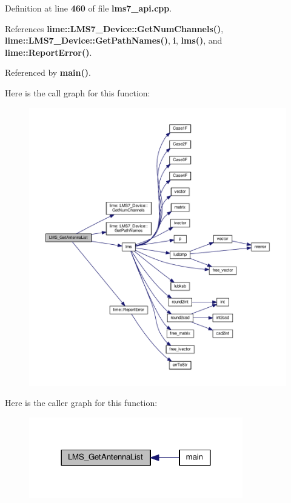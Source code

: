 Definition at line {\bf 460} of file {\bf lms7\+\_\+api.\+cpp}.



References {\bf lime\+::\+L\+M\+S7\+\_\+\+Device\+::\+Get\+Num\+Channels()}, {\bf lime\+::\+L\+M\+S7\+\_\+\+Device\+::\+Get\+Path\+Names()}, {\bf i}, {\bf lms()}, and {\bf lime\+::\+Report\+Error()}.



Referenced by {\bf main()}.



Here is the call graph for this function\+:
\nopagebreak
\begin{figure}[H]
\begin{center}
\leavevmode
\includegraphics[width=350pt]{df/de1/lms7__api_8cpp_aa91eeed3941fc1695de93d53af5f5a64_cgraph}
\end{center}
\end{figure}




Here is the caller graph for this function\+:
\nopagebreak
\begin{figure}[H]
\begin{center}
\leavevmode
\includegraphics[width=264pt]{df/de1/lms7__api_8cpp_aa91eeed3941fc1695de93d53af5f5a64_icgraph}
\end{center}
\end{figure}


